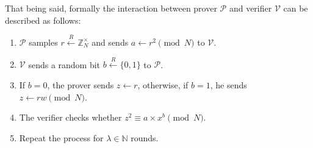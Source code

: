 \documentclass[../lecture-notes-148x210.tex]{subfiles}
\begin{document}
That being said, formally the interaction between prover $\mathcal{P}$ and verifier $\mathcal{V}$ can be described as follows:
\begin{enumerate}
    \item $\mathcal{P}$ samples $r \xleftarrow{R} \mathbb{Z}_N^{\times}$ and sends $a \gets r^2 \pmod{N}$ to $\mathcal{V}$.
    \item $\mathcal{V}$ sends a random bit $b \xleftarrow{R} \{0,1\}$ to $\mathcal{P}$.
    \item If $b=0$, the prover sends $z \gets r$, otherwise, if $b=1$, he sends $z \gets rw \pmod{N}$.
    \item The verifier checks whether $z^2 \equiv a\times x^{b} \pmod{N}$.
    \item Repeat the process for $\lambda \in \mathbb{N}$ rounds.
\end{enumerate}
\end{document}
